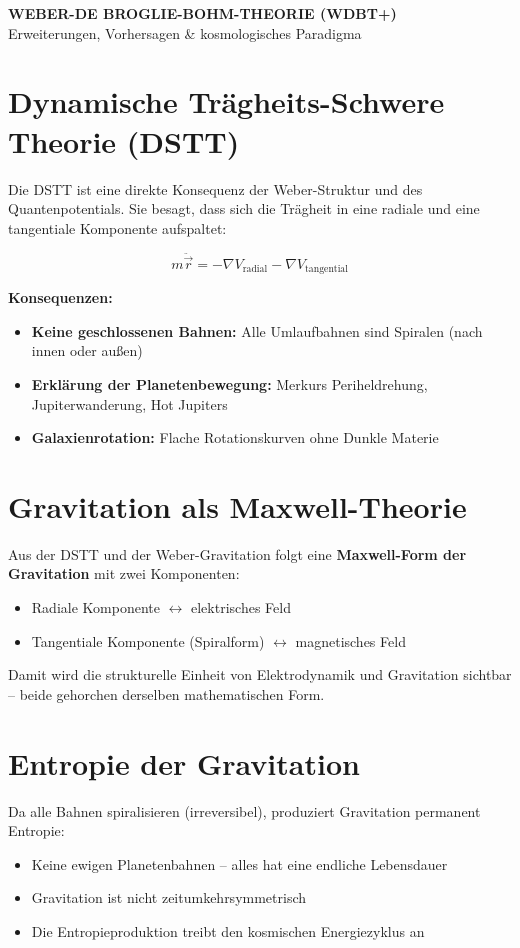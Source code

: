 \documentclass[12pt,a4paper]{article}
\begin{document}
\newpage
\begin{center}
    \Large\textbf{WEBER-DE BROGLIE-BOHM-THEORIE (WDBT+)} \\
    \large{Erweiterungen, Vorhersagen \& kosmologisches Paradigma}
\end{center}
\vspace{0.5cm}

\section*{Dynamische Trägheits-Schwere Theorie (DSTT)}
Die DSTT ist eine direkte Konsequenz der Weber-Struktur und des Quantenpotentials. Sie besagt, dass sich die Trägheit in eine radiale und eine tangentiale Komponente aufspaltet:

\begin{equation}
m\ddot{\vec{r}} = -\nabla V_{\text{radial}} - \nabla V_{\text{tangential}}
\end{equation}

\textbf{Konsequenzen:}
\begin{itemize}
    \item \textbf{Keine geschlossenen Bahnen:} Alle Umlaufbahnen sind Spiralen (nach innen oder außen)
    \item \textbf{Erklärung der Planetenbewegung:} Merkurs Periheldrehung, Jupiterwanderung, Hot Jupiters
    \item \textbf{Galaxienrotation:} Flache Rotationskurven ohne Dunkle Materie
\end{itemize}

\section*{Gravitation als Maxwell-Theorie}
Aus der DSTT und der Weber-Gravitation folgt eine \textbf{Maxwell-Form der Gravitation} mit zwei Komponenten:
\begin{itemize}
    \item Radiale Komponente $\leftrightarrow$ elektrisches Feld
    \item Tangentiale Komponente (Spiralform) $\leftrightarrow$ magnetisches Feld
\end{itemize}
Damit wird die strukturelle Einheit von Elektrodynamik und Gravitation sichtbar – beide gehorchen derselben mathematischen Form.

\section*{Entropie der Gravitation}
Da alle Bahnen spiralisieren (irreversibel), produziert Gravitation permanent Entropie:
\begin{itemize}
    \item Keine ewigen Planetenbahnen – alles hat eine endliche Lebensdauer
    \item Gravitation ist nicht zeitumkehrsymmetrisch
    \item Die Entropieproduktion treibt den kosmischen Energiezyklus an
\end{itemize}
\end{document}
